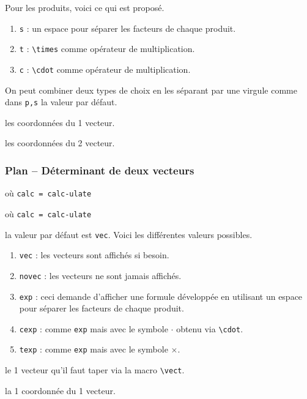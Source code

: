 \documentclass[12pt,a4paper]{article}
\newcommand\env[1]{\texttt{#1}}
\newcommand\macro[1]{\env{\textbackslash{}#1}}
\theoremstyle{definition}
\newcommand\mwhyprefix[2]{%
	\texttt{#1 = #1-#2}%
}
\newcommand\prefix[1]{%
	\texttt{#1}%
}
\begin{document}
            Pour les produits, voici ce qui est proposé.
\begin{enumerate}
	\item \prefix{s} : un espace pour séparer les facteurs de chaque produit.

	\item \prefix{t} : \macro{times} comme opérateur de multiplication.

	\item \prefix{c} : \macro{cdot} comme opérateur de multiplication.
\end{enumerate}

            On peut combiner deux types de choix en les séparant par une virgule comme dans \verb+p,s+ la valeur par défaut.


 les coordonnées du 1\ier{} vecteur.

 les coordonnées du 2\ieme{} vecteur.
\subsubsection{Plan -- Déterminant de deux vecteurs}

  où \quad \mwhyprefix{calc}{ulate}

 où \quad \mwhyprefix{calc}{ulate}


\IDoption{} la valeur par défaut est \verb+vec+. Voici les différentes valeurs possibles.
\begin{enumerate}
	\item \verb+vec+ : les vecteurs sont affichés si besoin.

	\item \verb+novec+ : les vecteurs ne sont jamais affichés.

	\item \verb+exp+ : ceci demande d'afficher une formule développée en utilisant un espace pour séparer les facteurs de chaque produit.

	\item \verb+cexp+ : comme \verb+exp+ mais avec le symbole $\cdot$ obtenu via \macro{cdot}.

	\item \verb+texp+ : comme \verb+exp+ mais avec le symbole $\times$.
\end{enumerate}


 le 1\ier{} vecteur qu'il faut taper via la macro \macro{vect}.

 la 1\iere{} coordonnée du 1\ier{} vecteur.
\end{document}
